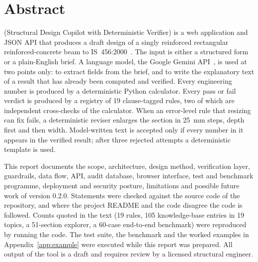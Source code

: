 \chapter*{Abstract}

\sdcv{} (Structural Design Copilot with Deterministic Verifier) is a web application and JSON API that produces a draft design of a singly reinforced rectangular reinforced-concrete beam to IS~456:2000~\cite{is456}. The input is either a structured form or a plain-English brief. A language model, the Google Gemini API~\cite{gemini}, is used at two points only: to extract fields from the brief, and to write the explanatory text of a result that has already been computed and verified. Every engineering number is produced by a deterministic Python calculator. Every pass or fail verdict is produced by a registry of 19 clause-tagged rules, two of which are independent cross-checks of the calculator. When an error-level rule that resizing can fix fails, a deterministic reviser enlarges the section in 25~mm steps, depth first and then width. Model-written text is accepted only if every number in it appears in the verified result; after three rejected attempts a deterministic template is used.

This report documents the scope, architecture, design method, verification layer, guardrails, data flow, API, audit database, browser interface, test and benchmark programme, deployment and security posture, limitations and possible future work of version 0.2.0. Statements were checked against the source code of the repository, and where the project README and the code disagree the code is followed. Counts quoted in the text (19 rules, 105 knowledge-base entries in 19 topics, a 51-section explorer, a 60-case end-to-end benchmark) were reproduced by running the code. The test suite, the benchmark and the worked examples in Appendix~\ref{app:example} were executed while this report was prepared. All output of the tool is a draft and requires review by a licensed structural engineer.
